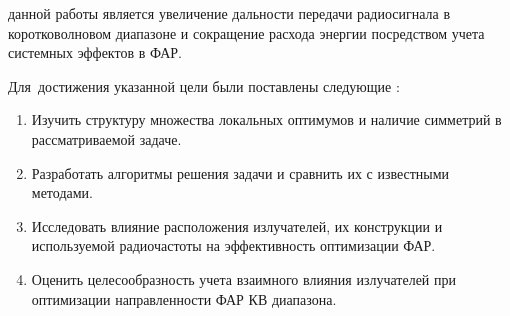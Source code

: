 
{\aim} данной работы является увеличение
дальности передачи радиосигнала в коротковолновом диапазоне и сокращение расхода энергии посредством учета системных эффектов в ФАР.

Для~достижения указанной цели были поставлены следующие {\tasks}:
\begin{enumerate}[beginpenalty=10000] %
  \item Изучить структуру множества локальных оптимумов и наличие симметрий в рассматриваемой задаче.
  \item Разработать алгоритмы решения задачи и сравнить их с известными методами.
  \item Исследовать влияние расположения излучателей, их конструкции и используемой радиочастоты на эффективность оптимизации ФАР.
  \item Оценить целесообразность учета взаимного влияния излучателей при оптимизации направленности ФАР КВ диапазона.
\end{enumerate}


{\novelty}



